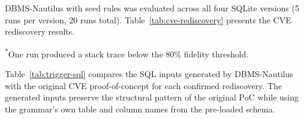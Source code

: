DBMS-Nautilus with seed rules was evaluated across all four SQLite versions (5 runs per version, 20 runs total). Table~\ref{tab:cve-rediscovery} presents the CVE rediscovery results.

\begin{table}[htbp]
\caption{CVE rediscovery results.}
\label{tab:cve-rediscovery}
\centering
{}
\smallskip\noindent\textsuperscript{*}One run produced a stack trace below the 80\% fidelity threshold.
\end{table}

Table~\ref{tab:trigger-sql} compares the SQL inputs generated by DBMS-Nautilus with the original CVE proof-of-concept for each confirmed rediscovery. The generated inputs preserve the structural pattern of the original PoC while using the grammar's own table and column names from the pre-loaded schema.

